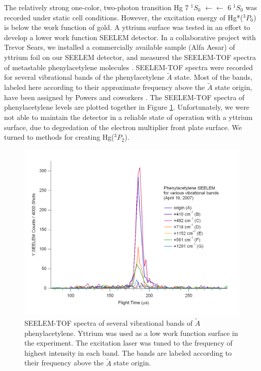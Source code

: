 The relatively strong one-color, two-photon transition Hg $7 \; ^1S_0$
$\leftarrow\leftarrow$ $6 \; ^1S_0$ was recorded under static cell
conditions.  However, the excitation energy of Hg*($^3P_0$) is below
the work function of gold.  A yttrium surface was tested in an effort
to develop a lower work function SEELEM detector.  In a collaborative
project with Trevor Sears, we installed a commercially available
sample (Alfa Aesar) of yttrium foil on our SEELEM detector, and
measured the SEELEM-TOF spectra of metastable phenylacetylene
molecules \cite{hofstein08}.  SEELEM-TOF spectra were recorded for
several vibrational bands of the phenylacetylene $\tilde{A}$ state.
Most of the bands, labeled here according to their approximate
frequency above the $\tilde{A}$ state origin, have been assigned by
Powers and coworkers \cite{powers81}.  The SEELEM-TOF spectra of
phenylacetylene levels are plotted together in Figure
\ref{fig:phenylacetylene-tofs}.  Unfortunately, we were not able to
maintain the detector in a reliable state of operation with a yttrium
surface, due to degredation of the electron multiplier front plate
surface.  We turned to methods for creating Hg($^3P_2$).

\begin{figure}
  \caption{SEELEM-TOF spectra of several vibrational bands of
    $\tilde{A}$ phenylacetylene.  Yttrium was used as a low work
    function surface in the experiment.  The excitation laser was
    tuned to the frequency of highest intensity in each band.  The
    bands are labeled according to their frequency above the
    $\tilde{A}$ state origin.}
  \label{fig:phenylacetylene-tofs}
  \centering
  \includegraphics[width=8in,angle=90]{phenylacetylene-tofs.pdf}
\end{figure}

